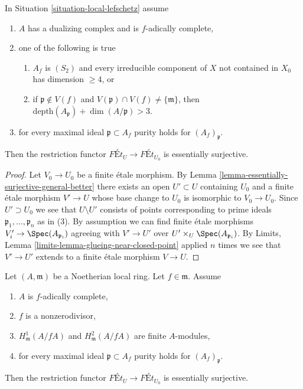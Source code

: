\begin{lemma}
\label{lemma-equivalence-better}
In Situation \ref{situation-local-lefschetz} assume
\begin{enumerate}
\item $A$ has a dualizing complex and is $f$-adically complete,
\item one of the following is true
\begin{enumerate}
\item $A_f$ is $(S_2)$ and every irreducible component of $X$
not contained in $X_0$ has dimension $\geq 4$, or
\item if $\mathfrak p \not \in V(f)$ and
$V(\mathfrak p) \cap V(f) \not = \{\mathfrak m\}$, then
$\text{depth}(A_\mathfrak p) + \dim(A/\mathfrak p) > 3$.
\end{enumerate}
\item for every maximal ideal $\mathfrak p \subset A_f$
purity holds for $(A_f)_\mathfrak p$.
\end{enumerate}
Then the restriction functor $\textit{F\'Et}_U \to \textit{F\'Et}_{U_0}$
is essentially surjective.
\end{lemma}

\begin{proof}
Let $V_0 \to U_0$ be a finite \'etale morphism. By
Lemma \ref{lemma-essentially-surjective-general-better}
there exists an open $U' \subset U$ containing $U_0$ and
a finite \'etale morphism $V' \to U$ whose base change to $U_0$
is isomorphic to $V_0 \to U_0$. Since $U' \supset U_0$
we see that $U \setminus U'$ consists of points corresponding
to prime ideals $\mathfrak p_1, \ldots, \mathfrak p_n$ as in (3).
By assumption we can find finite \'etale morphisms
$V'_i \to \Spec(A_{\mathfrak p_i})$ agreeing with
$V' \to U'$ over $U' \times_U \Spec(A_{\mathfrak p_i})$.
By Limits, Lemma \ref{limits-lemma-glueing-near-closed-point}
applied $n$ times we see that $V' \to U'$ extends to a finite \'etale
morphism $V \to U$.
\end{proof}

\begin{lemma}
\label{lemma-equivalence}
Let $(A, \mathfrak m)$ be a Noetherian local ring.
Let $f \in \mathfrak m$. Assume
\begin{enumerate}
\item $A$ is $f$-adically complete,
\item $f$ is a nonzerodivisor,
\item $H^1_\mathfrak m(A/fA)$ and $H^2_\mathfrak m(A/fA)$ are finite
$A$-modules,
\item for every maximal ideal $\mathfrak p \subset A_f$
purity holds for $(A_f)_\mathfrak p$.
\end{enumerate}
Then the restriction functor $\textit{F\'Et}_U \to \textit{F\'Et}_{U_0}$
is essentially surjective.
\end{lemma}


